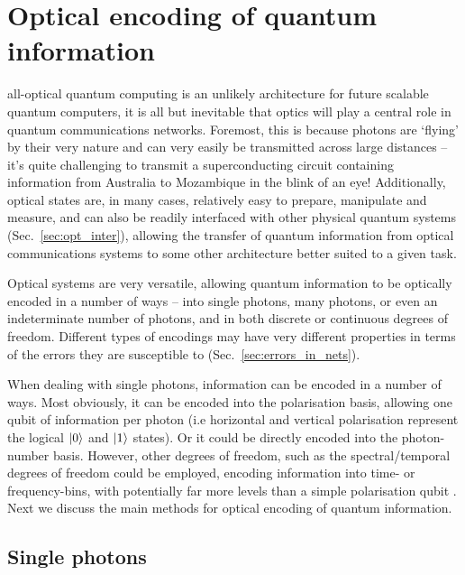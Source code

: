 %
%

\section{Optical encoding of quantum information} \label{sec:opt_enc_of_qi} 

 all-optical quantum computing is an unlikely architecture for future scalable quantum computers, it is all but inevitable that optics will play a central role in quantum communications networks. Foremost, this is because photons are `flying' by their very nature and can very easily be transmitted across large distances -- it's quite challenging to transmit a superconducting circuit containing information from Australia to Mozambique in the blink of an eye! Additionally, optical states are, in many cases, relatively easy to prepare, manipulate and measure, and can also be readily interfaced with other physical quantum systems (Sec.~\ref{sec:opt_inter}), allowing the transfer of quantum information from optical communications systems to some other architecture better suited to a given task.

Optical systems are very versatile, allowing quantum information to be optically encoded in a number of ways -- into single photons, many photons, or even an indeterminate number of photons, and in both discrete or continuous degrees of freedom. Different types of encodings may have very different properties in terms of the errors they are susceptible to (Sec.~\ref{sec:errors_in_nets}).

When dealing with single photons, information can be encoded in a number of ways. Most obviously, it can be encoded into the polarisation basis, allowing one qubit of information per photon (i.e horizontal and vertical polarisation represent the logical $|0\rangle$ and $|1\rangle$ states). Or it could be directly encoded into the photon-number basis. However, other degrees of freedom, such as the spectral/temporal degrees of freedom could be employed, encoding information into time- or frequency-bins, with potentially far more levels than a simple polarisation qubit \cite{bib:RohdeInfCap13}. Next we discuss the main methods for optical encoding of quantum information.

%
%

\subsection{Single photons} \label{sec:single_phot_enc} 


